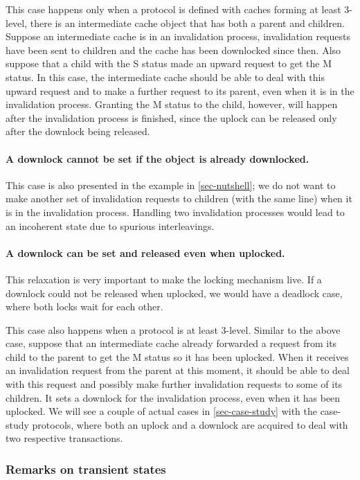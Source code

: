 This case happens only when a protocol is defined with caches forming at least 3-level, \ie{} there is an intermediate cache object that has both a parent and children.
Suppose an intermediate cache is in an invalidation process, \ie{} invalidation requests have been sent to children and the cache has been downlocked since then.
Also suppose that a child with the S status made an upward request to get the M status.
In this case, the intermediate cache should be able to deal with this upward request and to make a further request to its parent, even when it is in the invalidation process.
Granting the M status to the child, however, will happen after the invalidation process is finished, since the uplock can be released only after the downlock being released.

\paragraph{A downlock cannot be set if the object is already downlocked.}
This case is also presented in the example in \autoref{sec-nutshell}; we do not want to make another set of invalidation requests to children (with the same line) when it is in the invalidation process.
Handling two invalidation processes would lead to an incoherent state due to spurious interleavings.

\paragraph{A downlock can be set and released even when uplocked.}
This relaxation is very important to make the locking mechanism live.
If a downlock could not be released when uplocked, we would have a deadlock case, where both locks wait for each other.

This case also happens when a protocol is at least 3-level.
Similar to the above case, suppose that an intermediate cache already forwarded a request from its child to the parent to get the M status so it has been uplocked.
When it receives an invalidation request from the parent at this moment, it should be able to deal with this request and possibly make further invalidation requests to some of its children.
It sets a downlock for the invalidation process, even when it has been uplocked.
We will see a couple of actual cases in \autoref{sec-case-study} with the case-study protocols, where both an uplock and a downlock are acquired to deal with two respective transactions.

\subsubsection{Remarks on transient states}

